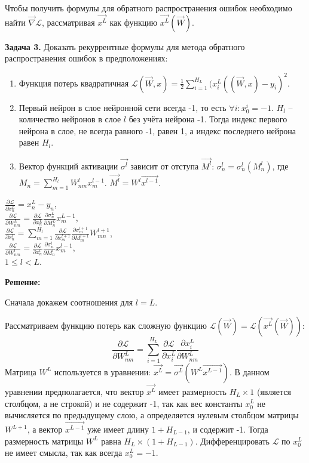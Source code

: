 Чтобы получить формулы для обратного распространения ошибок необходимо найти $\overrightarrow{\nabla} \mathcal{L}$, рассматривая $\overrightarrow{x^L}$ как функцию $\overrightarrow{x^L} (\overrightarrow{W})$.

\textbf{Задача 3.} Доказать рекуррентные формулы для метода обратного распространения ошибок в предположениях:
\begin{enumerate}
	\item Функция потерь квадратичная $\mathcal{L} (\overrightarrow{W}, x) = \frac{1}{2} \sum\limits_{i = 1}^{H_L} (x^L_i ((\overrightarrow{W}, x) - y_i)^2$.
	
	\item Первый нейрон в слое нейронной сети всегда -1, то есть $\forall i: x^i_0 = -1$. $H_l$ -- количество нейронов в слое $l$ без учёта нейрона -1. Тогда индекс первого нейрона в слое, не всегда равного -1, равен 1, а индекс последнего нейрона равен $H_l$.
	
	\item Вектор функций активации $\overrightarrow{\sigma^l}$ зависит от отступа $\overrightarrow{M^l}$: $\sigma^l_n = \sigma^l_n(M^l_n)$, где $M_n = \sum\limits_{m = 1}^{H_l} W^l_{nm} x^{l-1}_{m}$. $\overrightarrow{M^l} = W^l \overrightarrow{x^{l-1}}$.
\end{enumerate}
$
\frac{\partial \mathcal{L}}{\partial x^L_n} = x^L_n - y_n
$, \\
$
\frac{\partial \mathcal{L}}{\partial W^L_{nm}} = \frac{\partial \mathcal{L}}{\partial x^L_n} \frac{\partial \sigma^L_n}{\partial M^L_n} x^{L-1}_{m}
$, \\
$
\frac{\partial \mathcal{L}}{\partial x^{l}_n} = \sum\limits_{m = 1}^{H_l} \frac{\partial \mathcal{L}}{\partial x^{l+1}_m} \frac{\partial \sigma^{l+1}_m}{\partial M^{l+1}_m} W^{l+1}_{mn}
$, \\
$
\frac{\partial \mathcal{L}}{\partial W^{l}_{nm}} = \frac{\partial \mathcal{L}}{\partial x^{l}_n} \frac{\partial \sigma^{l}_n}{\partial M^{l}_n} x^{l-1}_{m}
$, \\
$1 \le l < L$.

\textbf{Решение:}

Сначала докажем соотношения для $l = L$.

Рассматриваем функцию потерь как сложную функцию $\mathcal{L} (\overrightarrow{W}) = \mathcal{L}(\overrightarrow{x^L}(\overrightarrow{W}))$:
$$
\frac{\partial \mathcal{L}}{\partial {W^{L}_{nm}}} = \sum\limits_{i = 1}^{H_L} \frac{\partial \mathcal{L}}{\partial x^L_i} \frac{\partial x^L_i}{\partial W^L_{nm}}
$$
Матрица $W^{L}$ используется в уравнении: $\overrightarrow{x^L} = \overrightarrow{\sigma^L} (W^L \overrightarrow{x^{L-1}})$. В данном уравнении предполагается, что вектор $\overrightarrow{x^L}$ имеет размерность $H_L \times 1$ (является столбцом, а не строкой) и не содержит -1, так как вес константы $x^L_0$ не вычисляется по предыдущему слою, а определяется нулевым столбцом матрицы $W^{L+1}$, а вектор $\overrightarrow{x^{L-1}}$ уже имеет длину $1+H_{L-1}$, и содержит -1. Тогда размерность матрицы $W^{L}$ равна $H_L \times (1+H_{L-1})$. Дифференцировать $\mathcal{L}$ по $x^L_0$ не имеет смысла, так как всегда $x^L_0 = -1$.


